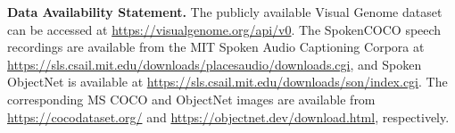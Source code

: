 \noindent\textbf{Data Availability Statement.}
The publicly available Visual Genome dataset can be accessed at
\url{https://visualgenome.org/api/v0}. The SpokenCOCO speech recordings
are available from the MIT Spoken Audio Captioning Corpora at
\url{https://sls.csail.mit.edu/downloads/placesaudio/downloads.cgi},
and Spoken ObjectNet is available at
\url{https://sls.csail.mit.edu/downloads/son/index.cgi}.
The corresponding MS COCO and ObjectNet images are available from
\url{https://cocodataset.org/} and \url{https://objectnet.dev/download.html},
respectively. 